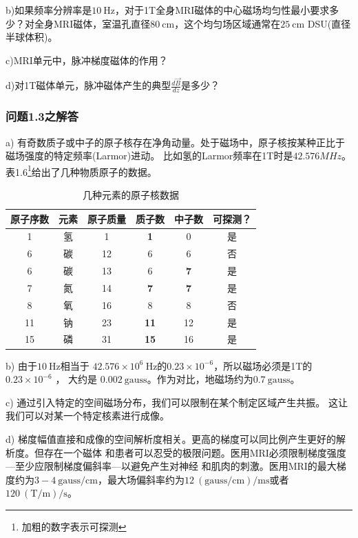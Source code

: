 b)如果频率分辨率是$10\ \mathrm{Hz}$，对于1T全身MRI磁体的中心磁场均匀性最小要求多少？对全身MRI磁体，室温孔直径$80\ \mathrm{cm}$，这个均匀场区域通常在$25\ \mathrm{cm}$ DSU(直径半球体积)。

c)MRI单元中，脉冲梯度磁体的作用？

d)对1T磁体单元，脉冲磁体产生的典型$\frac{d\vec{B}}{dz}$是多少？

\subsubsection{问题1.3之解答}
a) 有奇数质子或中子的原子核存在净角动量。处于磁场中，原子核按某种正比于磁场强度的特定频率(Larmor)进动。
比如氢的Larmor频率在1T时是$42.576MHz$。表1.6\footnote{加粗的数字表示可探测}给出了几种物质原子的数据。
\begin{table}[htbp]\small
  \centering
  \caption{几种元素的原子核数据} \label{tb:atomic}
\begin{tabular}{|c||c|c|c|c|c|}
  \hline
原子序数&元素&原子质量&质子数&中子数&可探测？ \\ \hline \hline
1&氢&1&\textbf{1}&0&是 \\ \hline
6&碳&12&6&6&否 \\ \hline
6&碳&13&6&\textbf{7}&是 \\ \hline
7&氮&14&\textbf{7}&\textbf{7}&是 \\ \hline
8&氧&16&8&8&否 \\ \hline
11&钠&23&\textbf{11}&12&是 \\ \hline
15&磷&31&\textbf{15}&16&是 \\ \hline
\end{tabular}
\end{table}

b) 由于$10\ \mathrm{Hz}$相当于 $42.576×10^6\ \mathrm{Hz}$的$0.23×10^{−6}$，所以磁场必须是1T的$0.23×10^{−6}$ ，
大约是 $0.002\ \mathrm{gauss}$。作为对比，地磁场约为$0.7 \ \mathrm{gauss}$。

c) 通过引入特定的空间磁场分布，我们可以限制在某个制定区域产生共振。
这让我们可以对某一个特定核素进行成像。

d) 梯度幅值直接和成像的空间解析度相关。更高的梯度可以同比例产生更好的解析度。但存在一个磁体
和患者可以忍受的极限问题。医用MRI必须限制梯度强度---至少应限制梯度偏斜率---以避免产生对神经
和肌肉的刺激。医用MRI的最大梯度约为$3-4 \ \mathrm{gauss/cm}$，最大场偏斜率约为$12\ \mathrm{(gauss/cm)/ms}$或者
$120\ \mathrm{(T/m)/s}$。

